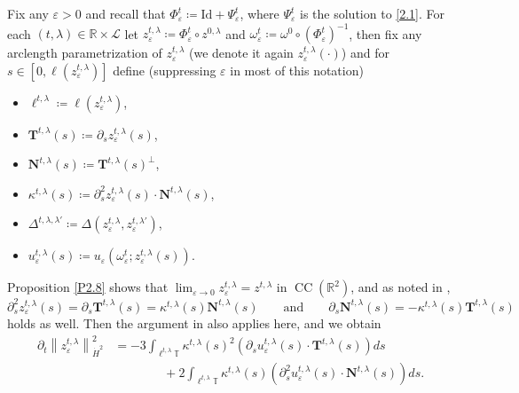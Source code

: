 \documentclass[reqno,centertags,12pt]{amsart}
\theoremstyle{definition}
\numberwithin{equation}{section}
\newcommand{\norm}[1]{\left\|#1\right\|}
\newcommand{\bbR}{{\mathbb{R}}}
\newcommand{\bbT}{{\mathbb{T}}}
\newcommand{\eps}{\varepsilon}
\begin{document}
Fix any $\eps>0$ and recall that $\Phi_{\eps}^{t}\coloneqq\mathrm{Id} + \Psi_{\eps}^{t}$,
where $\Psi_{\eps}^{t}$ is the solution to \eqref{2.1}.
For each $(t,\lambda)\in\bbR\times\mathcal{L}$ let $z_{\eps}^{t,\lambda} \coloneqq \Phi_{\eps}^{t}\circ z^{0,\lambda}$
and $\omega_{\eps}^{t}\coloneqq\omega^{0}\circ(\Phi_{\eps}^{t})^{-1}$, then fix any arclength parametrization of $z_{\eps}^{t,\lambda}$ (we denote it again $z_{\eps}^{t,\lambda}(\cdot)$) and for $s\in[0,\ell(z_{\eps}^{t,\lambda})]$ define (suppressing $\eps$ in most of this notation)
\begin{itemize}
    \item $\ell^{t,\lambda}\coloneqq \ell(z_{\eps}^{t,\lambda})$,

    \item $\mathbf{T}^{t,\lambda}(s) \coloneqq \partial_{s}z_{\eps}^{t,\lambda}(s)$,

    \item $\mathbf{N}^{t,\lambda}(s) \coloneqq \mathbf{T}^{t,\lambda}(s)^{\perp}$,

    \item $\kappa^{t,\lambda}(s) \coloneqq
    \partial_{s}^{2}z_{\eps}^{t,\lambda}(s)\cdot \mathbf{N}^{t,\lambda}(s)$,
    
        \item $\Delta^{t,\lambda,\lambda'} \coloneqq
    \Delta(z_{\eps}^{t,\lambda}, z_{\eps}^{t,\lambda'})$,

    \item $u_{\eps}^{t,\lambda}(s) \coloneqq
    u_{\eps}(\omega_{\eps}^{t}; z_{\eps}^{t,\lambda}(s))$.
\end{itemize}
Proposition \ref{P2.8} shows that $\lim_{\eps\to 0} z_\eps^{t,\lambda}= z^{t,\lambda}$ in $\operatorname{CC}(\bbR^{2})$, and
as noted in \cite[Section~4]{JeoZlaTouching}, 
\[
    \partial_{s}^{2}z_{\eps}^{t,\lambda}(s) = \partial_{s}\mathbf{T}^{t,\lambda}(s)
    = \kappa^{t,\lambda}(s)\mathbf{N}^{t,\lambda}(s)
    \qquad\textrm{and}\qquad
    \partial_{s}\mathbf{N}^{t,\lambda}(s) = -\kappa^{t,\lambda}(s)\mathbf{T}^{t,\lambda}(s)
\]
holds as well.
Then the argument in \cite[Lemma~4.1]{JeoZlaTouching} also applies here, and we obtain
\begin{equation}\label{3.2}
    \begin{aligned}
        \partial_{t}\norm{z_{\eps}^{t,\lambda}}_{\dot{H}^{2}}^{2}
        &= -3\int_{\ell^{t,\lambda}\bbT}\kappa^{t,\lambda}(s)^{2}
        \left(\partial_{s}u_{\eps}^{t,\lambda}(s) \cdot \mathbf{T}^{t,\lambda}(s)\right)ds
        \\&\qquad\qquad        
        + 2\int_{\ell^{t,\lambda}\bbT}\kappa^{t,\lambda}(s)
        \left(\partial_{s}^{2}u_{\eps}^{t,\lambda}(s) \cdot \mathbf{N}^{t,\lambda}(s)\right)ds.
    \end{aligned}
\end{equation}
\end{document}
